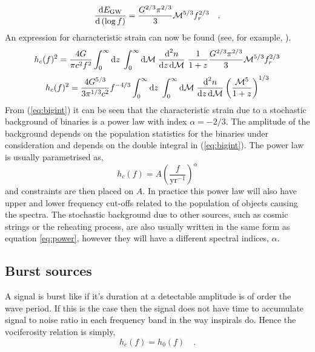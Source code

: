 \begin{equation} \frac{\textrm{d}E_{\textrm{GW}}}{\textrm{d}\left(\log f \right)}=\frac{G^{2/3}\pi^{2/3}}{3}{\cal{M}}^{5/3}f_{r}^{2/3} \quad . \end{equation}
An expression for characteristic strain can now be found (see, for example, \cite{SesanaVecchioColancino}).
\begin{equation}
h_{c}(f)^{2}=\frac{4G}{\pi c^{2}f^{2}}\int_{0}^{\infty}\textrm{d}z\;\int_{0}^{\infty}\textrm{d}{\cal{M}}\;\frac{\textrm{d}^{2}n}{\textrm{d}z\,\textrm{d}{\cal{M}}}\;\frac{1}{1+z}\frac{G^{2/3}\pi^{2/3}}{3}{\cal{M}}^{5/3}f_{r}^{2/3}
\end{equation}
\begin{equation}\label{eq:bigint}
h_{c}(f)^{2} =\frac{4G^{5/3}}{3\pi^{1/3}c^{2}}f^{-4/3}\int_{0}^{\infty}\textrm{d}z\;\int_{0}^{\infty}\textrm{d}{\cal{M}}\;\frac{\textrm{d}^{2}n}{\textrm{d}z\,\textrm{d}{\cal{M}}}\left( \frac{{\cal{M}}^{5}}{1+z} \right)^{1/3}
\end{equation}
From (\ref{eq:bigint}) it can be seen that the characteristic strain due to a stochastic background of binaries is a power law with index $\alpha=-2/3$. The amplitude of the background depends on the population statistics for the binaries under consideration and depends on the double integral in (\ref{eq:bigint}). The power law is usually parametrised as,
\begin{equation}\label{eq:power} h_{c}(f)= A\left(\frac{f}{\textrm{yr}^{-1}}\right)^{\alpha} \end{equation}
and constraints are then placed on $A$. In practice this power law will also have upper and lower frequency cut-offs related to the population of objects causing the spectra. The stochastic background due to other sources, such as cosmic strings or the reheating process, are also usually written in the same form as equation \ref{eq:power}, however they will have a different spectral indices, $\alpha$.

\subsection{Burst sources}
A signal is burst like if it's duration at a detectable amplitude is of order the wave period. If this is the case then the signal does not have time to accumulate signal to noise ratio in each frequency band in the way inspirals do. Hence the vociferosity relation is simply,
\begin{equation}\label{eq:simple} h_{c}(f)=h_{0}(f) \quad . \end{equation}


